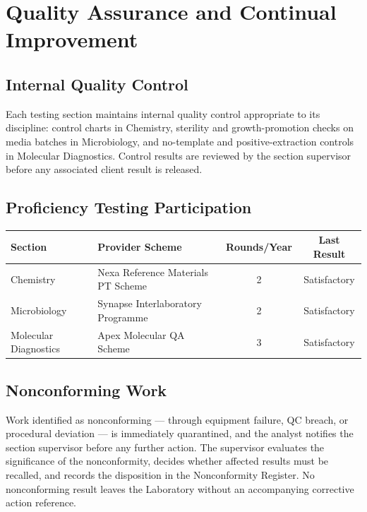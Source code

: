 
\section{Quality Assurance and Continual Improvement}

\subsection{Internal Quality Control}

Each testing section maintains internal quality control appropriate to its discipline:
control charts in Chemistry, sterility and growth-promotion checks on media batches in
Microbiology, and no-template and positive-extraction controls in Molecular Diagnostics.
Control results are reviewed by the section supervisor before any associated client result
is released.

\subsection{Proficiency Testing Participation}

\begin{table}[h]
\centering
\small
\renewcommand{\arraystretch}{1.3}
\begin{tabularx}{\linewidth}{@{}l X c c@{}}
\toprule
\textbf{Section} & \textbf{Provider Scheme} & \textbf{Rounds/Year} & \textbf{Last Result} \\
\midrule
Chemistry & Nexa Reference Materials PT Scheme & 2 & Satisfactory \\
Microbiology & Synapse Interlaboratory Programme & 2 & Satisfactory \\
Molecular Diagnostics & Apex Molecular QA Scheme & 3 & Satisfactory \\
\bottomrule
\end{tabularx}
\end{table}

\subsection{Nonconforming Work}

Work identified as nonconforming --- through equipment failure, QC breach, or procedural
deviation --- is immediately quarantined, and the analyst notifies the section supervisor
before any further action. The supervisor evaluates the significance of the nonconformity,
decides whether affected results must be recalled, and records the disposition in the
Nonconformity Register. No nonconforming result leaves the Laboratory without an
accompanying corrective action reference.

